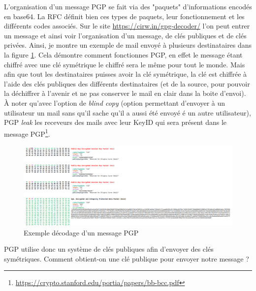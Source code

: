 L'organisation d'un message PGP se fait via des "paquets" d'informations encodés en base64. La RFC définit bien ces types de paquets, leur fonctionnement et les différents codes associés. Sur le site \url{https://cirw.in/gpg-decoder/} l'on peut entrer un message et ainsi voir l'organisation d'un message, de clés publiques et de clés privées. Ainsi, je montre un exemple de mail envoyé à plusieurs destinataires dans la figure \ref{fig:PGP_DECODE}. Cela démontre comment fonctionnes PGP, en effet le message étant chiffré avec une clé symétrique le chiffré sera le même pour tout le monde. Mais afin que tout les destinataires puisses avoir la clé symétrique, la clé est chiffrée à l'aide des clés publiques des différents destinataires (et de la source, pour pouvoir la déchiffrer à l'avenir et ne pas conserver le mail en clair dans la boite d'envoi). À noter qu'avec l'option de \textit{blind copy} (option permettant d'envoyer à un utilisateur un mail sans qu'il sache qu'il a aussi été envoyé é un autre utilisateur), PGP \textit{leak} les receveurs des mails avec leur KeyID qui sera présent dans le message PGP\footnote{\url{https://crypto.stanford.edu/portia/papers/bb-bcc.pdf}}.\\
\begin{figure}[h!]
	\includegraphics[width=14cm]{images/examplePGPDecode.png}
	\centering
	\caption{Exemple décodage d'un message PGP}
	\label{fig:PGP_DECODE}
\end{figure}
PGP utilise donc un système de clés publiques afin d'envoyer des clés symétriques. Comment obtient-on une clé publique pour envoyer notre message ?\\
